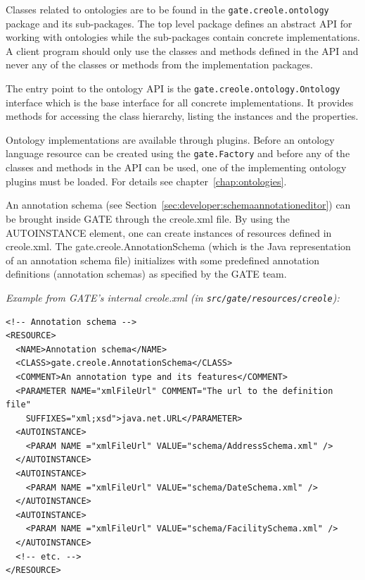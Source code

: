 Classes related to ontologies are to be found in the {\tt gate.creole.ontology}
package and its sub-packages. The top level package defines an abstract API for
working with ontologies while the sub-packages contain concrete implementations.
A client program should only use the classes and methods defined in the 
API and never any of the classes or methods from the implementation packages.

The entry point to the ontology API is the {\tt gate.creole.ontology.Ontology}
interface which is the base interface for all concrete implementations. It
provides methods for accessing the class hierarchy, listing the instances and the
properties.

Ontology implementations are available through plugins. Before an ontology
language resource can be created using the \texttt{gate.Factory} and before
any of the classes and methods in the API can be used, one of the implementing
ontology plugins must be loaded. For details see chapter~\ref{chap:ontologies}.


An annotation schema (see Section~\ref{sec:developer:schemaannotationeditor}) can
be brought inside GATE through the creole.xml file. By using the AUTOINSTANCE
element, one can create instances of resources defined in creole.xml. The
gate.creole.AnnotationSchema (which is the Java representation of an annotation
schema file) initializes with some predefined annotation definitions (annotation
schemas) as specified by the GATE team.

{\em Example from GATE's internal creole.xml (in
  {\tt src/gate/resources/creole}):}

\small
\begin{small}\begin{verbatim}
<!-- Annotation schema -->
<RESOURCE>
  <NAME>Annotation schema</NAME>
  <CLASS>gate.creole.AnnotationSchema</CLASS>
  <COMMENT>An annotation type and its features</COMMENT>
  <PARAMETER NAME="xmlFileUrl" COMMENT="The url to the definition file"
    SUFFIXES="xml;xsd">java.net.URL</PARAMETER>
  <AUTOINSTANCE>
    <PARAM NAME ="xmlFileUrl" VALUE="schema/AddressSchema.xml" />
  </AUTOINSTANCE>
  <AUTOINSTANCE>
    <PARAM NAME ="xmlFileUrl" VALUE="schema/DateSchema.xml" />
  </AUTOINSTANCE>
  <AUTOINSTANCE>
    <PARAM NAME ="xmlFileUrl" VALUE="schema/FacilitySchema.xml" />
  </AUTOINSTANCE>
  <!-- etc. -->
</RESOURCE>
\end{verbatim}\end{small}
\nnormalsize

